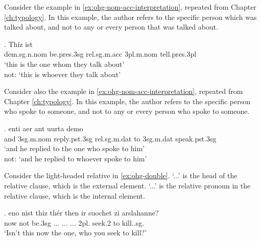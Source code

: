 Consider the example in \ref{ex:ohg-nom-acc-interpretation}, repeated from Chapter \ref{ch:typology}.
In this example, the author refers to the specific person which was talked about, and not to any or every person that was talked about.

\exg. Thíz ist   \\
\ac{dem}.\ac{sg}.\ac{n}.\ac{nom} be.\ac{pres}.3\ac{sg}\scsub{[nom]} \ac{rel}.\ac{sg}.\ac{m}.\ac{acc}
3\ac{pl}.\ac{m}.\ac{nom} tell.\ac{pres}.3\ac{pl}\scsub{[acc]}\\
`this is the one whom they talk about'\\
not: `this is whoever they talk about' \label{ex:ohg-nom-acc-interpretation}

Consider also the example in \ref{ex:ohg-nom-acc-interpretation}, repeated from Chapter \ref{ch:typology}.
In this example, the author refers to the specific person who spoke to someone, and not to any or every person who spoke to someone.

\exg. enti aer {ant uurta} demo  \\
and 3\ac{sg}.\ac{m}.\ac{nom} reply.\ac{pst}.3\ac{sg}\scsub{[dat]} \ac{rel}.\ac{sg}.\ac{m}.\ac{dat} {to 3\ac{sg}.\ac{m}.\ac{dat}} speak.\ac{pst}.3\ac{sg}\scsub{[nom]}\\
`and he replied to the one who spoke to him'\\
not: `and he replied to whoever spoke to him'
 \label{ex:ohg-dat-nom-rep}

 Consider the light-headed relative in \ref{ex:ohg-double}.  `...' is the head of the relative clause, which is the external element.  `...' is the relative pronoun in the relative clause, which is the internal element.

 \exg. eno nist thiz thér then ir suochet zi arslahanne?\\
  now {not be.3\ac{sg}} ... ...
  ... 2\ac{pl}. seek.2 to kill..\ac{sg}.\\
  `Isn't this now the one, who you seek to kill?'\label{ex:ohg-double}

